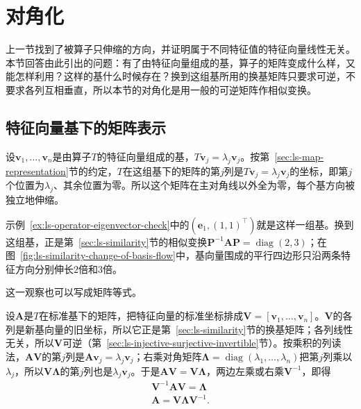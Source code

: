
\section{对角化}
\label{sec:ls-matrix-powers}
\label{sec:ch06-powers-spectrum}

上一节找到了被算子只伸缩的方向，并证明属于不同特征值的特征向量线性无关。本节回答由此引出的问题：有了由特征向量组成的基，算子的矩阵变成什么样，又能怎样利用？这样的基什么时候存在？换到这组基所用的换基矩阵只要求可逆，不要求各列互相垂直，所以本节的对角化是用一般的可逆矩阵作相似变换。

\subsection{特征向量基下的矩阵表示}
\label{sec:matrix-analysis-spectrum}

设$\bm v_1,\ldots,\bm v_n$是由算子$T$的特征向量组成的基，$T\bm v_j=\lambda_j\bm v_j$。按第~\ref{sec:ls-map-representation}节的约定，$T$在这组基下的矩阵的第$j$列是$T\bm v_j=\lambda_j\bm v_j$的坐标，即第$j$个位置为$\lambda_j$、其余位置为零。所以这个矩阵在主对角线以外全为零，每个基方向被独立地伸缩。

示例~\ref{ex:ls-operator-eigenvector-check}中的$(\bm e_1,(1,1)^{\top})$就是这样一组基。换到这组基，正是第~\ref{sec:ls-similarity}节的相似变换$\bm P^{-1}\bm A\bm P=\operatorname{diag}(2,3)$；在图~\ref{fig:ls-similarity-change-of-basis-flow}中，基向量围成的平行四边形只沿两条特征方向分别伸长$2$倍和$3$倍。

这一观察也可以写成矩阵等式。

设$\bm A$是$T$在标准基下的矩阵，把特征向量的标准坐标排成$\bm V=[\bm v_1,\ldots,\bm v_n]$。$\bm V$的各列是新基向量的旧坐标，所以它正是第~\ref{sec:ls-similarity}节的换基矩阵；各列线性无关，所以$\bm V$可逆（第~\ref{sec:ls-injective-surjective-invertible}节）。按乘积的列读法，$\bm A\bm V$的第$j$列是$\bm A\bm v_j=\lambda_j\bm v_j$；右乘对角矩阵$\bm\Lambda=\operatorname{diag}(\lambda_1,\ldots,\lambda_n)$把第$j$列乘以$\lambda_j$，所以$\bm V\bm\Lambda$的第$j$列也是$\lambda_j\bm v_j$。于是$\bm A\bm V=\bm V\bm\Lambda$，两边左乘或右乘$\bm V^{-1}$，即得
\[
 \begin{gathered}
\bm V^{-1}\bm A\bm V=\bm\Lambda\\
\bm A=\bm V\bm\Lambda\bm V^{-1}.
 \end{gathered}
\]

